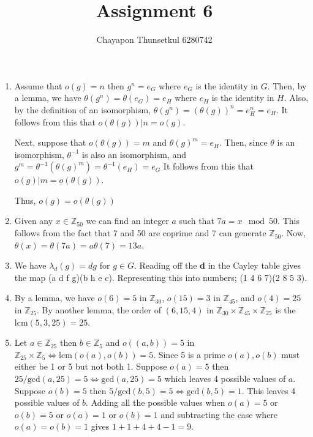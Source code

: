 \documentclass[]{article}
\title{Assignment 6}
\author{Chayapon Thunsetkul 6280742}
\newcommand{\Z}{\mathbb{Z}}
\begin{document}
\maketitle
\begin{enumerate}
    \item Assume that $o(g) = n $ then $g^n = e_G$ where $e_G$ is the identity in $G$. Then, by a lemma, we have $\theta(g^n) = \theta(e_G) = e_H$ where $e_H$ is the identity in $H$.
    Also, by the definition of an isomorphism, $\theta(g^n) = (\theta(g))^n = e_H^n = e_H$.
    It follows from this that $o(\theta(g)) | n = o(g)$.

    Next, suppose that $o(\theta(g)) = m$ and $\theta(g)^m = e_H$. Then, since $\theta$ is an isomorphism, $\theta^{-1}$ is also an isomorphism, and $g^m = \theta^{-1}(\theta(g)^m) = \theta^{-1}(e_H) = e_G$
    It follows from this that $o(g) | m = o(\theta(g))$.

    Thus, $o(g) = o(\theta(g))$

    \item Given any $x \in \mathbb{Z}_{50}$ we can find an integer $a$ such that $7a = x \mod{50}$. This follows from the fact that 7 and 50 are coprime and 7 can generate $\mathbb{Z}_{50}$. Now, $\theta(x) = \theta(7a) = a\theta(7) = 13a$.

    \item We have $\lambda_d(g) = dg$ for $g \in G$. Reading off the \textbf{d} in the Cayley table gives the map (a d f g)(b h e c). Representing this into numbers; (1 4 6 7)(2 8 5 3).
    \item By a lemma, we have $o(6) = 5$ in $\Z_{30}$, $o(15) = 3$ in $\Z_{45}$, and $o(4) = 25$ in $\Z_{25}$. By another lemma, the order of $(6,15,4)$ in $\Z_{30} \times \Z_{45} \times \Z_{25}$ is the $\text{lcm}(5,3,25) = 25$.
    \item Let $a \in \Z_{25}$ then $b \in \Z_{5}$ and $o((a,b)) = 5$ in $\Z_{25} \times \Z_{5} \iff \text{lcm}(o(a),o(b)) = 5$. Since 5 is a prime $o(a),o(b)$ must either be 1 or 5 but not both 1. Suppose $o(a) = 5$ then $25/\text{gcd}(a,25) = 5 \iff \text{gcd}(a,25) = 5$ which leaves 4 possible values of $a$. Suppose $o(b) = 5$ then $5/\text{gcd}(b,5) = 5 \iff \text{gcd}(b,5) =1$. This leaves 4 possible values of $b$. 
    Adding all the possible values when $o(a) = 5$ or $o(b) = 5$ or $o(a) =1 $ or $o(b) = 1$ and subtracting the case where $o(a) = o(b) = 1$ gives $1 + 1 + 4 +4 -1 = 9$.
\end{enumerate}
\end{document}
